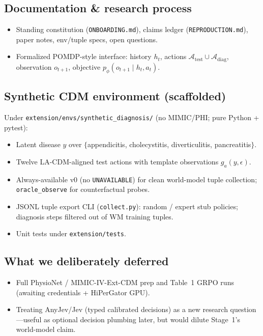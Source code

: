 \documentclass[11pt,letterpaper]{article}
\begin{document}
\subsection{Documentation \& research process}
\begin{itemize}
  \item Standing constitution (\texttt{ONBOARDING.md}), claims ledger (\texttt{REPRODUCTION.md}), paper notes, env/tuple specs, open questions.
  \item Formalized POMDP-style interface: history \(h_t\), actions \(\mathcal{A}_{\mathrm{test}}\cup\mathcal{A}_{\mathrm{diag}}\), observation \(o_{t+1}\), objective \(p_\phi(o_{t+1}\mid h_t,a_t)\).
\end{itemize}

\subsection{Synthetic CDM environment (scaffolded)}
Under \texttt{extension/envs/synthetic\_diagnosis/} (no MIMIC/PHI; pure Python + pytest):
\begin{itemize}
  \item Latent disease \(y\) over \(\{\)appendicitis, cholecystitis, diverticulitis, pancreatitis\(\}\).
  \item Twelve LA-CDM-aligned test actions with template observations \(g_a(y,\epsilon)\).
  \item Always-available v0 (no \texttt{UNAVAILABLE}) for clean world-model tuple collection; \texttt{oracle\_observe} for counterfactual probes.
  \item JSONL tuple export CLI (\texttt{collect.py}): random / expert stub policies; diagnosis steps filtered out of WM training tuples.
  \item Unit tests under \texttt{extension/tests}.
\end{itemize}

\subsection{What we deliberately deferred}
\begin{itemize}
  \item Full PhysioNet / MIMIC-IV-Ext-CDM prep and Table~1 GRPO runs (awaiting credentials + HiPerGator GPU).
  \item Treating AnyJev/Jev (typed calibrated decisions) as a new research question---useful as optional decision plumbing later, but would dilute Stage~1's world-model claim.
\end{itemize}
\end{document}
